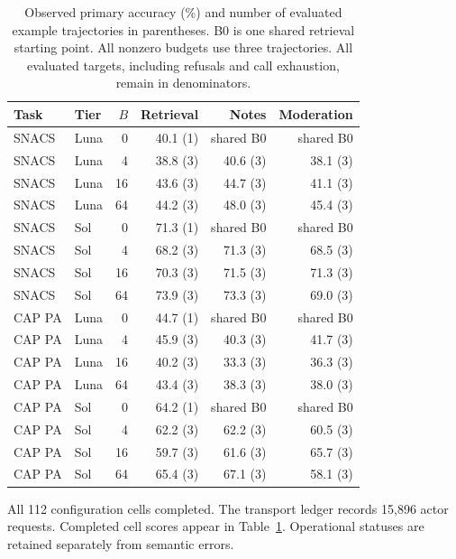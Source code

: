 \begin{table}[t]
\centering\small
\begin{tabular}{llrrrr}
\toprule
Task & Tier & $B$ & Retrieval & Notes & Moderation \\
\midrule
SNACS & Luna & 0 & 40.1 (1) & shared B0 & shared B0 \\
SNACS & Luna & 4 & 38.8 (3) & 40.6 (3) & 38.1 (3) \\
SNACS & Luna & 16 & 43.6 (3) & 44.7 (3) & 41.1 (3) \\
SNACS & Luna & 64 & 44.2 (3) & 48.0 (3) & 45.4 (3) \\
SNACS & Sol & 0 & 71.3 (1) & shared B0 & shared B0 \\
SNACS & Sol & 4 & 68.2 (3) & 71.3 (3) & 68.5 (3) \\
SNACS & Sol & 16 & 70.3 (3) & 71.5 (3) & 71.3 (3) \\
SNACS & Sol & 64 & 73.9 (3) & 73.3 (3) & 69.0 (3) \\
CAP PA & Luna & 0 & 44.7 (1) & shared B0 & shared B0 \\
CAP PA & Luna & 4 & 45.9 (3) & 40.3 (3) & 41.7 (3) \\
CAP PA & Luna & 16 & 40.2 (3) & 33.3 (3) & 36.3 (3) \\
CAP PA & Luna & 64 & 43.4 (3) & 38.3 (3) & 38.0 (3) \\
CAP PA & Sol & 0 & 64.2 (1) & shared B0 & shared B0 \\
CAP PA & Sol & 4 & 62.2 (3) & 62.2 (3) & 60.5 (3) \\
CAP PA & Sol & 16 & 59.7 (3) & 61.6 (3) & 65.7 (3) \\
CAP PA & Sol & 64 & 65.4 (3) & 67.1 (3) & 58.1 (3) \\
\bottomrule
\end{tabular}
\caption{Observed primary accuracy (\%) and number of evaluated example trajectories in parentheses. B0 is one shared retrieval starting point. All nonzero budgets use three trajectories. All evaluated targets, including refusals and call exhaustion, remain in denominators.}
\label{tab:subscription}
\end{table}
All 112 configuration cells completed. The transport ledger records 15,896 actor requests. Completed cell scores appear in Table~\ref{tab:subscription}. Operational statuses are retained separately from semantic errors.
